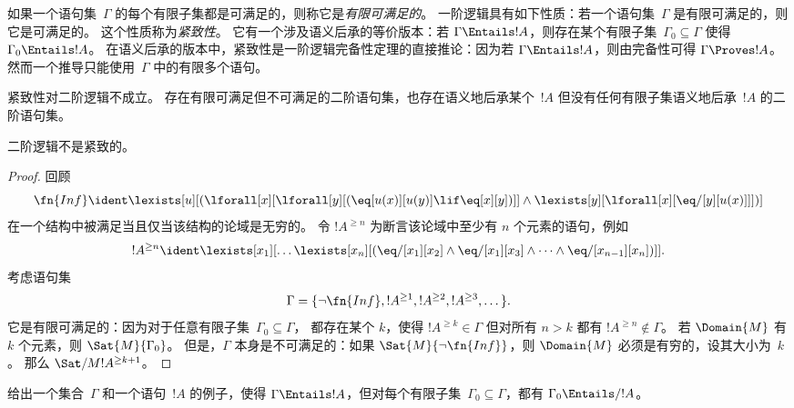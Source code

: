\documentclass[../../../include/open-logic-section]{subfiles}
\begin{document}


\begin{explain}
如果一个语句集~$\Gamma$ 的每个有限子集都是可满足的，则称它是\emph{有限可满足的}。
一阶逻辑具有如下性质：若一个语句集~$\Gamma$ 是有限可满足的，则它是可满足的。
这个性质称为\emph{紧致性}。
它有一个涉及语义后承的等价版本：若 $\Gamma \Entails !A$，则存在某个有限子集~$\Gamma_0 \subseteq \Gamma$ 使得 $\Gamma_0 \Entails !A$。
在语义后承的版本中，紧致性是一阶逻辑完备性定理的直接推论：因为若 $\Gamma \Entails !A$，则由完备性可得 $\Gamma \Proves !A$。
然而一个推导只能使用~$\Gamma$ 中的有限多个语句。

紧致性对二阶逻辑不成立。
存在有限可满足但不可满足的二阶语句集，也存在语义地后承某个~$!A$ 但没有任何有限子集语义地后承~$!A$ 的二阶语句集。
\end{explain}


\begin{thm}
二阶逻辑不是紧致的。
\end{thm}

\begin{proof}
回顾 \[
\fn{Inf} \ident \lexists[u][(\lforall[x][\lforall[y][(\eq[u(x)][u(y)]
      \lif \eq[x][y])]] \land \lexists[y][\lforall[x][\eq/[y][u(x)]]])]
\] 在一个结构中被满足当且仅当该结构的论域是无穷的。
令 $!A^{\ge n}$ 为断言该论域中至少有 $n$ 个元素的语句，例如
\[
!A^{\ge n} \ident \lexists[x_1][\dots\lexists[x_n][(\eq/[x_1][x_2]
    \land \eq/[x_1][x_3] \land \dots \land \eq/[x_{n-1}][x_n])]].
\]
考虑语句集
\[
\Gamma = \{\lnot \fn{Inf}, !A^{\ge 1}, !A^{\ge 2}, !A^{\ge 3}, \dots\}.
\]
它是有限可满足的：因为对于任意有限子集~$\Gamma_0 \subseteq \Gamma$，
都存在某个 $k$，使得 $!A^{\ge k} \in \Gamma$ 但对所有 $n>k$ 都有 $!A^{\ge n} \notin \Gamma$。
若 $\Domain{M}$ 有 $k$ 个元素，则 $\Sat{M}{\Gamma_0}$。
但是，$\Gamma$ 本身是不可满足的：如果
$\Sat{M}{\lnot \fn{Inf}}$，则 $\Domain{M}$ 必须是有穷的，设其大小为~$k$。
那么 $\Sat/{M}{!A^{\ge k+1}}$。
\end{proof}

\begin{prob}
给出一个集合~$\Gamma$ 和一个语句~$!A$ 的例子，使得 $\Gamma \Entails !A$，但对每个有限子集~$\Gamma_0 \subseteq \Gamma$，都有 $\Gamma_0 \Entails/ !A$。
\end{prob}
\end{document}

